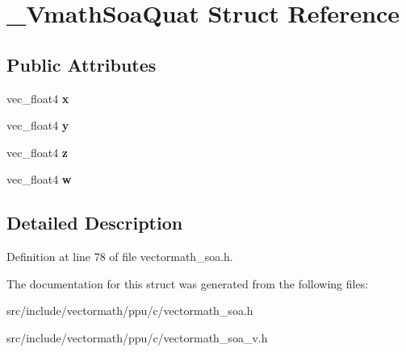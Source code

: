 \hypertarget{struct__VmathSoaQuat}{\section{\-\_\-\-Vmath\-Soa\-Quat Struct Reference}
\label{struct__VmathSoaQuat}
}
\subsection*{Public Attributes}
\begin{DoxyCompactItemize}
\item 
\hypertarget{struct__VmathSoaQuat_aa712262467c9ed091907fa59449ea8b1}{vec\-\_\-float4 {\bfseries x}}\label{struct__VmathSoaQuat_aa712262467c9ed091907fa59449ea8b1}

\item 
\hypertarget{struct__VmathSoaQuat_a79f5d0c8023e5e717a55f9ec2d850974}{vec\-\_\-float4 {\bfseries y}}\label{struct__VmathSoaQuat_a79f5d0c8023e5e717a55f9ec2d850974}

\item 
\hypertarget{struct__VmathSoaQuat_a5357809e4b152dac8759b46d8ccd3dbf}{vec\-\_\-float4 {\bfseries z}}\label{struct__VmathSoaQuat_a5357809e4b152dac8759b46d8ccd3dbf}

\item 
\hypertarget{struct__VmathSoaQuat_a3dab6ee991f837ae25c81826caf4a115}{vec\-\_\-float4 {\bfseries w}}\label{struct__VmathSoaQuat_a3dab6ee991f837ae25c81826caf4a115}

\end{DoxyCompactItemize}


\subsection{Detailed Description}


Definition at line 78 of file vectormath\-\_\-soa.\-h.



The documentation for this struct was generated from the following files\-:\begin{DoxyCompactItemize}
\item 
src/include/vectormath/ppu/c/vectormath\-\_\-soa.\-h\item 
src/include/vectormath/ppu/c/vectormath\-\_\-soa\-\_\-v.\-h\end{DoxyCompactItemize}
